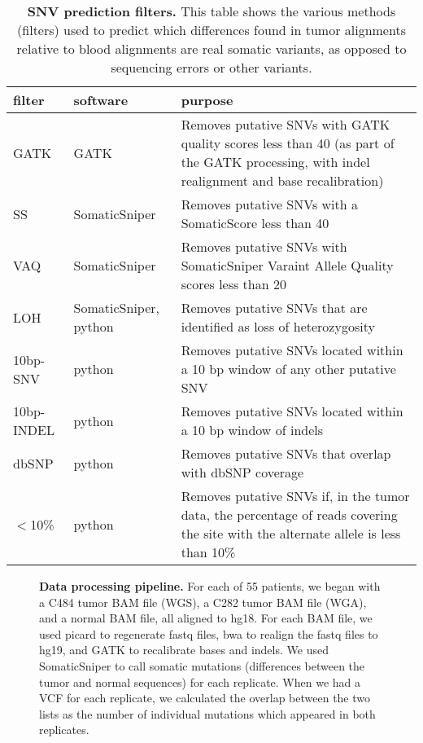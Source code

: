 \documentclass[11 pt]{article} %
\begin{document}
\begin{landscape}
\begin{table}
\caption{\textbf{SNV prediction filters.} This table shows the various methods (filters) used to predict which differences found in tumor alignments relative to blood alignments are real somatic variants, as opposed to sequencing errors or other variants.}
\label{tab:filters}
\begin{tabular}{ p{2.25cm} p{4.25cm} p{14cm} }
	filter & software & purpose \\
	\hline
	GATK & GATK & Removes putative SNVs with GATK quality scores less than 40 (as part of the GATK processing, with indel realignment and base recalibration) \\
	SS & SomaticSniper & Removes putative SNVs with a SomaticScore less than 40 \\
	VAQ & SomaticSniper & Removes putative SNVs with SomaticSniper Varaint Allele Quality scores less than 20 \\
	LOH & SomaticSniper, python & Removes putative SNVs that are identified as loss of heterozygosity \\
	10bp-SNV & python & Removes putative SNVs located within a 10 bp window of any other putative SNV \\
	10bp-INDEL & python & Removes putative SNVs located within a 10 bp window of indels \\
	dbSNP & python & Removes putative SNVs that overlap with dbSNP coverage \\
	$<$10\% & python & Removes putative SNVs if, in the tumor data, the percentage of reads covering the site with the alternate allele is less than 10\% \\
\end{tabular}
\end{table}
\end{landscape}


\begin{figure}
\caption{\textbf{Data processing pipeline.} For each of 55 patients, we began with a C484 tumor BAM file (WGS), a C282 tumor BAM file (WGA), and a normal BAM file, all aligned to hg18. For each BAM file, we used picard to regenerate fastq files, bwa to realign the fastq files to hg19, and GATK to recalibrate bases and indels. We used SomaticSniper to call somatic mutations (differences between the tumor and normal sequences) for each replicate. When we had a VCF for each replicate, we calculated the overlap between the two lists as the number of individual mutations which appeared in both replicates.}
\label{fig:pipeline}
\end{figure}
\end{document}
